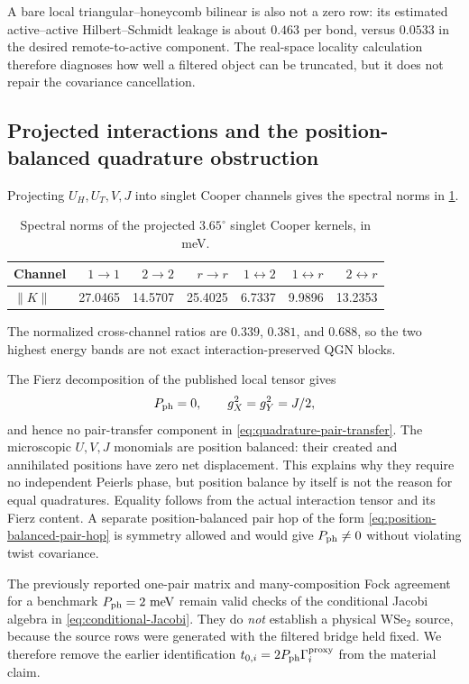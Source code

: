 \documentclass[11pt]{article}
\theoremstyle{remark}
\begin{document}
A bare local triangular--honeycomb bilinear is also not a zero row: its estimated active--active Hilbert--Schmidt leakage is about $0.463$ per bond, versus $0.0533$ in the desired remote-to-active component.  The real-space locality calculation therefore diagnoses how well a filtered object can be truncated, but it does not repair the covariance cancellation.

\subsection{Projected interactions and the position-balanced quadrature obstruction}

Projecting $U_H,U_T,V,J$ into singlet Cooper channels gives the spectral norms in \cref{tab:365-kernels}.
\begin{table}[H]
\centering
\caption{Spectral norms of the projected $3.65^\circ$ singlet Cooper kernels, in meV.}
\label{tab:365-kernels}
\begin{tabular}{@{}lrrrrrr@{}}
\toprule
Channel & $1\to1$ & $2\to2$ & $r\to r$ & $1\leftrightarrow2$ & $1\leftrightarrow r$ & $2\leftrightarrow r$\\
\midrule
$\|K\|$ & 27.0465 & 14.5707 & 25.4025 & 6.7337 & 9.9896 & 13.2353\\
\bottomrule
\end{tabular}
\end{table}
The normalized cross-channel ratios are $0.339$, $0.381$, and $0.688$, so the two highest energy bands are not exact interaction-preserved QGN blocks.

The Fierz decomposition of the published local tensor gives
\begin{equation}
 P_{\rm ph}=0,
 \qquad
 g_X^2=g_Y^2=J/2,
 \label{eq:UVJ-equal-quadratures-revised}
\end{equation}
and hence no pair-transfer component in \cref{eq:quadrature-pair-transfer}.  The microscopic $U,V,J$ monomials are position balanced: their created and annihilated positions have zero net displacement.  This explains why they require no independent Peierls phase, but position balance by itself is not the reason for equal quadratures.  Equality follows from the actual interaction tensor and its Fierz content.  A separate position-balanced pair hop of the form \eqref{eq:position-balanced-pair-hop} is symmetry allowed and would give $P_{\rm ph}\ne0$ without violating twist covariance.

The previously reported one-pair matrix and many-composition Fock agreement for a benchmark $P_{\rm ph}=2~{\rm meV}$ remain valid checks of the conditional Jacobi algebra in \cref{eq:conditional-Jacobi}.  They do \emph{not} establish a physical WSe$_2$ source, because the source rows were generated with the filtered bridge held fixed.  We therefore remove the earlier identification $t_{0,i}=2P_{\rm ph}\Gamma_i^{\rm proxy}$ from the material claim.
\end{document}
